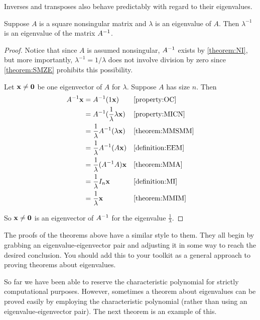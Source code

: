 \documentclass{ximera}
\begin{document}
Inverses and transposes also behave predictably with regard to their eigenvalues.



\begin{theorem}
\label{theorem:EIM}

Suppose $A$ is a square nonsingular matrix and $\lambda$ is an
eigenvalue of $A$.  Then $\lambda^{-1}$ is an eigenvalue of the matrix
$A^{-1}$.


\begin{proof}
Notice that since $A$ is assumed nonsingular, $A^{-1}$ exists by \ref{theorem:NI}, but more importantly, $\lambda^{-1}=1/\lambda$  does not involve division by zero since \ref{theorem:SMZE} prohibits this possibility.

Let $\mathbf{x}\neq\mathbf{0}$ be one eigenvector of $A$ for $\lambda$. Suppose $A$ has size $n$.  Then
\begin{align*}
A^{-1}\mathbf{x}&=A^{-1}(1\mathbf{x})&&\ref{property:OC}\\
&=A^{-1}(\frac{1}{\lambda}\lambda\mathbf{x})&&\ref{property:MICN}\\
&=\frac{1}{\lambda}A^{-1}(\lambda\mathbf{x})&&\ref{theorem:MMSMM}\\
&=\frac{1}{\lambda}A^{-1}(A\mathbf{x})&&\ref{definition:EEM}\\
&=\frac{1}{\lambda}(A^{-1}A)\mathbf{x}&&\ref{theorem:MMA}\\
&=\frac{1}{\lambda}I_n\mathbf{x}&&\ref{definition:MI}\\
&=\frac{1}{\lambda}\mathbf{x}&&\ref{theorem:MMIM}
\end{align*}

So $\mathbf{x}\neq\mathbf{0}$ is an eigenvector of $A^{-1}$ for the eigenvalue $\frac{1}{\lambda}$.

\end{proof}
\end{theorem}

The proofs of the theorems above have a similar style to them.  They all begin by grabbing an eigenvalue-eigenvector pair and adjusting it in some way to reach the desired conclusion.  You should add this to your toolkit as a general approach to proving theorems about eigenvalues.



So far we have been able to reserve the characteristic polynomial for strictly computational purposes.  However, sometimes a theorem about eigenvalues can be proved easily by employing the characteristic polynomial (rather than using an eigenvalue-eigenvector pair).  The next theorem is an example of this.
\end{document}

